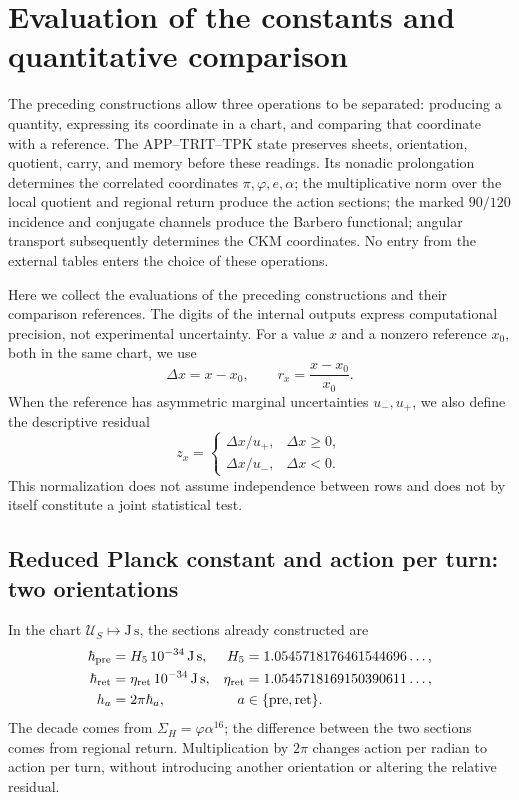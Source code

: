 \section{Evaluation of the constants and quantitative comparison}
\label{sec:ii-contraste-cuantitativo}

The preceding constructions allow three operations to be separated:
producing a quantity, expressing its coordinate in a chart, and comparing that
coordinate with a reference. The APP--TRIT--TPK state preserves sheets,
orientation, quotient, carry, and memory before these readings. Its
nonadic prolongation determines the correlated coordinates
\(\pi,\varphi,e,\alpha\); the multiplicative norm over the local quotient and regional return
produce the action sections; the marked \(90/120\) incidence and
conjugate channels produce the Barbero functional; angular
transport subsequently determines the CKM coordinates. No entry from the external
tables enters the choice of these operations.

Here we collect the evaluations of the preceding constructions and their
comparison references. The digits of the internal outputs express
computational precision, not experimental uncertainty. For a value
\(x\) and a nonzero reference \(x_0\), both in the same chart, we use
\[
 \Delta x=x-x_0,\qquad r_x=\frac{x-x_0}{x_0}.
\]
When the reference has asymmetric marginal uncertainties
\(u_-,u_+\), we also define the descriptive residual
\begin{equation}
 z_x=\begin{cases}
 \Delta x/u_+,&\Delta x\geq0,\\
 \Delta x/u_-,&\Delta x<0.
 \end{cases}
 \label{eq:ii-residuo-marginal}
\end{equation}
This normalization does not assume independence between rows and does not
by itself constitute a joint statistical test.

\subsection{Reduced Planck constant and action per turn: two orientations}

In the chart \(\mathcal U_S\mapsto\mathrm{J\,s}\), the sections already
constructed are
\begin{align}
 \hbar_{\rm pre}&=H_5\,10^{-34}\,\mathrm{J\,s},&
 H_5&=1.0545718176461544696\ldots,\\
 \hbar_{\rm ret}&=\eta_{\rm ret}\,10^{-34}\,\mathrm{J\,s},&
 \eta_{\rm ret}&=1.0545718169150390611\ldots,\\
 h_a&=2\pi\hbar_a,&a&\in\{\mathrm{pre},\mathrm{ret}\}.
 \label{eq:ii-cuatro-coordenadas-planck}
\end{align}
The decade comes from \(\Sigma_H=\varphi\alpha^{16}\); the difference between
the two sections comes from regional return. Multiplication by \(2\pi\)
changes action per radian to action per turn, without introducing another
orientation or altering the relative residual.

